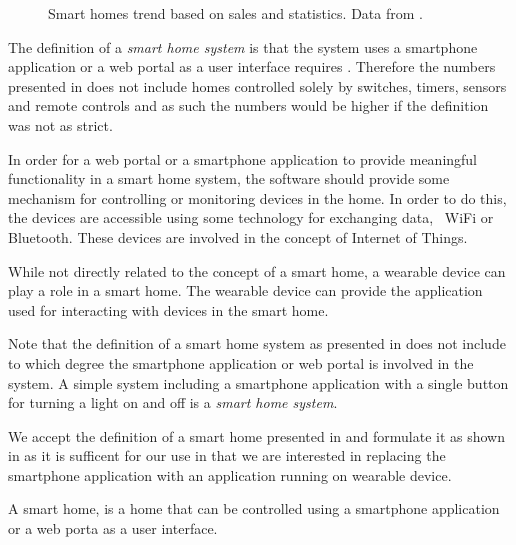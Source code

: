 \begin{figure}[!hbt]
  \centering
  
  \caption{Smart homes trend based on sales and statistics. Data from \protect\cite{SMARTHOMETREND}.}
  \label{fig:smarthomestrend}
\end{figure}

The definition of a \emph{smart home system} is  that the system uses a smartphone application or a web portal as a user interface requires \cite{SMARTHOMETREND}. Therefore the numbers presented in  does not include homes controlled solely by switches, timers, sensors and remote controls and as such the numbers would be higher if the definition was not as strict.

In order for a web portal or a smartphone application to provide meaningful functionality in a smart home system, the software should provide some mechanism for controlling or monitoring devices in the home. In order to do this, the devices are accessible using some technology for exchanging data, \eg~WiFi or Bluetooth. These devices are involved in the concept of Internet of Things. 

While not directly related to the concept of a smart home, a wearable device can play a role in a smart home. The wearable device can provide the application used for interacting with devices in the smart home.

Note that the definition of a smart home system as presented in \cite{SMARTHOMETREND} does not include to which degree the smartphone application or web portal is involved in the system. A simple system including a smartphone application with a single button for turning a light on and off is a \emph{smart home system}.

We accept the definition of a smart home presented in \cite{SMARTHOMETREND} and formulate it as shown in  as it is sufficent for our use in that we are interested in replacing the smartphone application with an application running on wearable device.

\begin{definition}
\label{def:smarthome}
A smart home, is a home that can be controlled using a smartphone application or a web porta as a user interface.
\end{definition}

